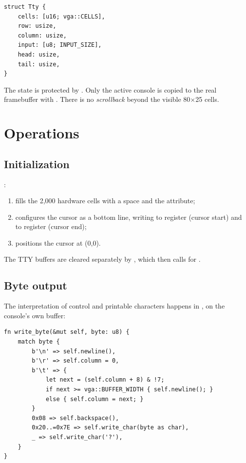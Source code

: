 \begin{lstlisting}[caption={State maintained per virtual console.},label={lst:consolestate}]
struct Tty {
    cells: [u16; vga::CELLS],
    row: usize,
    column: usize,
    input: [u8; INPUT_SIZE],
    head: usize,
    tail: usize,
}
\end{lstlisting}

The state is protected by . Only the
active console is copied to the real framebuffer with . There
is no \emph{scrollback} beyond the visible 80$\times$25 cells.

\section{Operations}

\subsection{Initialization}

:

\begin{enumerate}
  \item fills the 2,000 hardware cells with a space and the 
        attribute;
  \item configures the cursor as a bottom line, writing
         to register  (cursor start) and
         to register  (cursor end);
  \item positions the cursor at (0,0).
\end{enumerate}

The TTY buffers are cleared separately by , which then calls
 for .

\subsection{Byte output}

The interpretation of control and printable characters happens in
, on the console's own buffer:

\begin{lstlisting}[caption={Handling of control and printable characters.},label={lst:writebyte}]
fn write_byte(&mut self, byte: u8) {
    match byte {
        b'\n' => self.newline(),
        b'\r' => self.column = 0,
        b'\t' => {
            let next = (self.column + 8) & !7;
            if next >= vga::BUFFER_WIDTH { self.newline(); }
            else { self.column = next; }
        }
        0x08 => self.backspace(),
        0x20..=0x7E => self.write_char(byte as char),
        _ => self.write_char('?'),
    }
}
\end{lstlisting}

